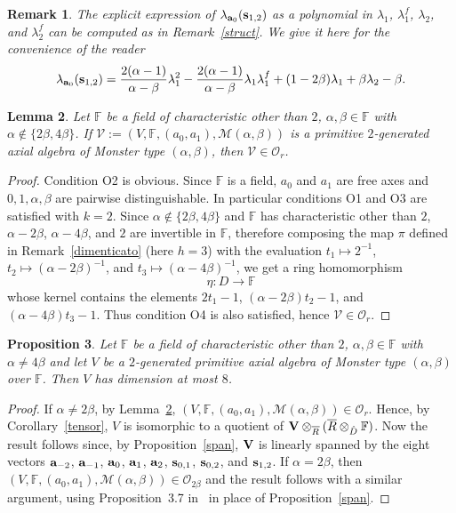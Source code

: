 \documentclass[a4paper]{amsart}
\newtheorem{lemma}{Lemma}[section]
\newtheorem{remark}[lemma]{Remark}
\newtheorem{proposition}[lemma]{Proposition}
\newcommand{\Ro}{{\overline R}}
\newcommand{\Vo}{{\bf V}}
\newcommand{\F}{{\mathbb F}}
\newcommand{\lm}{\lambda}
\newcommand{\al}{\alpha}
\newcommand{\bt}{\beta}
\newcommand{\ba}{{\bf a}}
\newcommand{\bs}{{\bf s}}
\begin{document}
\begin{remark}\label{lambdaw2}
The explicit expression of $\lambda_{\ba_0}(\bs_{1,2})$ as a polynomial in $\lambda_1$, $\lambda_1^f$, $\lambda_2$, and $\lm_2^f$ can be computed as in Remark~\ref{struct}. We give it here for the convenience of the reader
\begin{equation}\label{lms12}
\lambda_{\ba_0}(\bs_{1,2})=\frac{2(\alpha-1)}{\alpha-\beta}\lambda_1^2-\frac{2(\alpha-1)}{\alpha-\beta}\lambda_1\lambda_1^f+(1-2\beta)\lambda_1+\beta\lambda_2-\beta.
\end{equation}
\end{remark}

\begin{lemma}\label{campo}
Let $\F$ be a field of characteristic other than $2$, $\al, \bt\in \F$ with $\al\not \in \{2\bt, 4\bt\}$. If $\mathcal V:=(V, \F, (a_0, a_1), \mathcal M(\al, \bt))$ is a primitive $2$-generated  axial algebra of Monster type $(\al, \bt)$, then  $\mathcal V\in \mathcal O_r$.
\end{lemma}
\begin{proof}
Condition O2 is obvious.
Since $\F$ is a field, $a_0$ and $a_1$ are free axes and $0,1,\al, \bt$ are pairwise distinguishable. In particular conditions O1 and O3 are satisfied with $k=2$. 
Since $\al\not \in \{2\bt, 4\bt\}$ and $\F$ has characteristic other than $2$, $\al-2\bt$, $\al-4\bt$, and $2$ are invertible in $\F$, therefore composing the map $\pi$ defined in Remark~\ref{dimenticato} (here $h=3$) with the evaluation $t_1\mapsto 2^{-1}$, $t_2\mapsto (\al-2\bt)^{-1}$, and $t_3\mapsto (\al-4\bt)^{-1}$, we get a ring homomorphism 
$$\eta\colon D\to \F$$
whose kernel contains the elements $2t_1-1$, $(\al-2\bt)t_2-1$, and $(\al-4\bt)t_3-1$. Thus condition O4 is also satisfied, hence $\mathcal V\in \mathcal O_r$.
\end{proof}
\bigskip

 
\begin{proposition}\label{reg}
Let $\F$ be a field of characteristic other than $2$, $\al, \bt \in \F$ with $\al\neq 4\bt$ and let $V$ be a 
 $2$-generated primitive axial algebra of Monster type $(\al, \bt)$ over $\F$. Then $V$ has dimension at most $8$.
\end{proposition}
\begin{proof}  If $\al\neq 2\bt$, by Lemma~\ref{campo}, $(V, \F, (a_0, a_1), \mathcal M(\al, \bt))\in \mathcal O_r$. Hence, by Corollary~\ref{tensor}, $V$ is isomorphic to a quotient of $\Vo\otimes_{\Ro } (\Ro\otimes_{\hat D}\F)$. Now the result follows since, by Proposition~\ref{span}, $\Vo$ is linearly spanned by the eight vectors $\ba_{-2}$, $\ba_{-1}$, $\ba_0$, $\ba_1$, $\ba_2$, $\bs_{0,1}$, $\bs_{0,2}$, and $\bs_{1,2}$. If $\al=2\bt$, then $(V, \F, (a_0, a_1), \mathcal M(\al, \bt))\in \mathcal O_{2\bt}$ and the result follows with a similar argument, using Proposition~3.7 in~\cite{FMS2} in place of Proposition~\ref{span}.
\end{proof}
\end{document}
